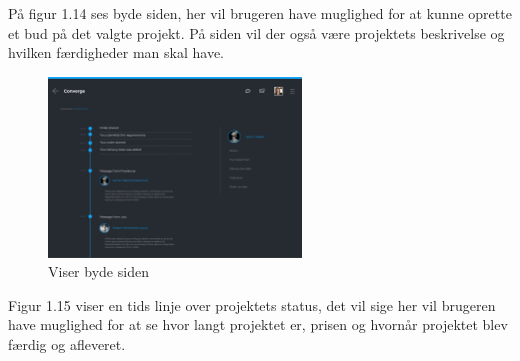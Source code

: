 På figur 1.14 ses byde siden, her vil brugeren have muglighed for at kunne oprette et bud på det valgte projekt. På siden vil der også være projektets beskrivelse og hvilken færdigheder man skal have. 

\begin{figure}[ht]
    \centering
\includegraphics[width=0.6\textwidth]{system-interface-pdf/Product.pdf}
\caption{Viser byde siden}
\label{fig:figure2}
\end{figure}

Figur 1.15 viser en tids linje over projektets status, det vil sige her vil brugeren have muglighed for at se hvor langt projektet er, prisen og hvornår projektet blev færdig og afleveret. 